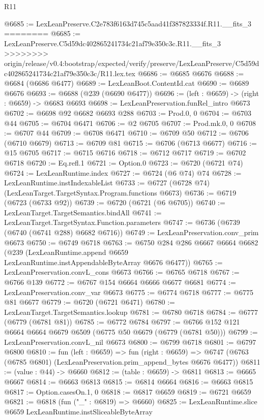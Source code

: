 \begin{lexlean}{R11}
\begin{coremodule}
{{{{{{{{{{{{{{{{{{{{{{{{{{{{{{{{{{{{{{{{{{{{{{{{{{{{{{{{{{{{{{{{{{{{{{{{{{{{{{{{{{@6685 := LexLeanPreserve.C2e783f6163d745c5aad41f387823334f.R11.__fits_3
========
@6685 := LexLeanPreserve.C5d59dc402865241734c21af79e350c3c.R11.__fits_3
>>>>>>>> origin/release/v0.4:bootstrap/expected/verify/preserve/LexLeanPreserve/C5d59dc402865241734c21af79e350c3c/R11.lex.tex
@6686 := @6685 @6676
@6688 := @6684 (@6686 @6477)
@6689 := LexLeanBoot.ContentId.cat
@6690 := @6689 @6676
@6693 := @6688 (@239 (@6690 @6477))
@6696 := (left : @6659) -> (right : @6659) -> @6683 @6693
@6698 := LexLeanPreservation.funRel_intro @6673
@6702 := @6698 @92 @6682 @6693 @288
@6703 := Prod.{0, 0}
@6704 := @6703 @44
@6705 := @6704 @6471
@6706 := @2 @6705
@6707 := Prod.mk.{0, 0}
@6708 := @6707 @44
@6709 := @6708 @6471
@6710 := @6709 @50
@6712 := @6706 (@6710 @6679)
@6713 := @6709 @81
@6715 := @6706 (@6713 @6677)
@6716 := @15 @6705
@6717 := @6715 @6716
@6718 := @6712 @6717
@6719 := @6702 @6718
@6720 := Eq.refl.{1}
@6721 := Option.{0}
@6723 := @6720 (@6721 @74)
@6724 := LexLeanRuntime.index
@6727 := @6724 (@6 @74) @74
@6728 := LexLeanRuntime.instIndexableList
@6733 := @6727 (@6728 @74) (LexLeanTarget.TargetSyntax.Program.functions @6673)
@6736 := @6719 (@6723 (@6733 @92))
@6739 := @6720 (@6721 (@6 @6705))
@6740 := LexLeanTarget.TargetSemantics.bindAll
@6741 := LexLeanTarget.TargetSyntax.Function.parameters
@6747 := @6736 (@6739 (@6740 (@6741 @288) @6682 @6716))
@6749 := LexLeanPreservation.conv_prim @6673
@6750 := @6749 @6718
@6763 := @6750
    @284
    @286
    @6667
    @6664
    @6682
    (@239 (LexLeanRuntime.append @6659 LexLeanRuntime.instAppendableByteArray @6676 @6477))
@6765 := LexLeanPreservation.convL_cons @6673
@6766 := @6765 @6718
@6767 := @6766 @139
@6772 := @6767 @154 @6664 @6666 @6677 @6681
@6774 := LexLeanPreservation.conv_var @6673
@6775 := @6774 @6718
@6777 := @6775 @81 @6677
@6779 := @6720 (@6721 @6471)
@6780 := LexLeanTarget.TargetSemantics.lookup
@6781 := @6780 @6718
@6784 := @6777 (@6779 (@6781 @81))
@6785 := @6772 @6784
@6797 := @6766 @152 @121 @6664 @6664 @6679 @6509 (@6775 @50 @6679 (@6779 (@6781 @50)))
@6799 := LexLeanPreservation.convL_nil @6673
@6800 := @6799 @6718
@6801 := @6797 @6800
@6810 := fun (left : @6659) =>
  fun (right : @6659) =>
  @6747 (@6763 (@6785 @6801) (LexLeanPreservation.prim_append_bytes @6676 @6477))
@6811 := (value : @44) -> @6660
@6812 := (table : @6659) -> @6811
@6813 := @6665 @6667
@6814 := @6663 @6813
@6815 := @6814 @6664
@6816 := @6663 @6815
@6817 := Option.casesOn.{1, 0}
@6818 := @6817 @6659
@6819 := @6721 @6659
@6821 := @6818 (fun ("_" : @6819) => @6660)
@6825 := LexLeanRuntime.slice @6659 LexLeanRuntime.instSliceableByteArray
}}}}}}}}}}}}}}}}}}}}}}}}}}}}}}}}}}}}}}}}}}}}}}}}}}}}}}}}}}}}}}}}}}}}}}}}}}}}}}}}}}
\end{coremodule}
\end{lexlean}
